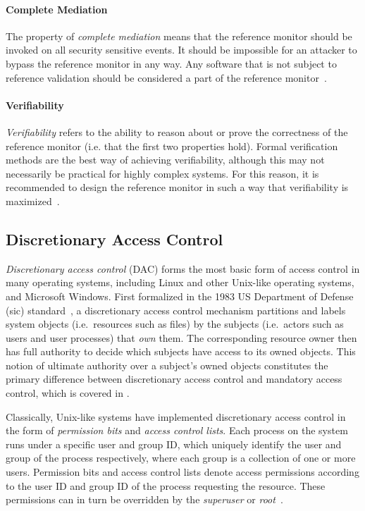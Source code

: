 \paragraph*{Complete Mediation}

The property of \textit{complete mediation} means that the reference monitor should be
invoked on all security sensitive events. It should be impossible for an attacker to
bypass the reference monitor in any way. Any software that is not subject to reference
validation should be considered a part of the reference
monitor~\cite{anderson1972_report}.

\paragraph*{Verifiability}

\textit{Verifiability} refers to the ability to reason about or prove the correctness of
the reference monitor (i.e. that the first two properties hold). Formal verification methods
are the best way of achieving verifiability, although this may not necessarily be practical
for highly complex systems. For this reason, it is recommended to design the reference monitor
in such a way that verifiability is maximized~\cite{anderson1972_report}.

\subsection{Discretionary Access Control}%
\label{ss:dac}

\textit{Discretionary access control} (DAC) forms the most basic form of access control in
many operating systems, including Linux and other Unix-like operating systems, and
Microsoft Windows. First formalized in the 1983 US Department of Defense (sic)
standard~\cite{orange_book}, a discretionary access control mechanism partitions and
labels system objects (i.e.~resources such as files) by the subjects (i.e.~actors such as
users and user processes) that \textit{own} them. The corresponding resource owner then
has full authority to decide which subjects have access to its owned objects. This notion
of ultimate authority over a subject's owned objects constitutes the primary difference
between discretionary access control and mandatory access control, which is covered in
.

Classically, Unix-like systems have implemented discretionary access control in the form
of \textit{permission bits} and \textit{access control lists}. Each process on the system
runs under a specific user and group ID, which uniquely identify the user and group of the
process respectively, where each group is a collection of one or more users. Permission
bits and access control lists denote access permissions according to the user ID and group
ID of the process requesting the resource. These permissions can in turn be overridden by
the \textit{superuser} or \textit{root}~\cite{van_oorschot2020_tools_jewels,
jaeger2008_os_security}.

